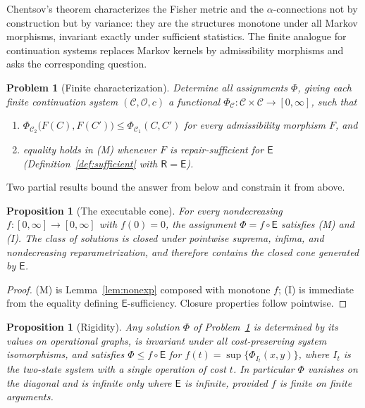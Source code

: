 \documentclass[11pt]{article}
\newtheorem{proposition}[theorem]{Proposition}
\newtheorem{problem}[theorem]{Problem}
\theoremstyle{remark}
\newcommand{\C}{\mathcal{C}}
\newcommand{\Ops}{\mathcal{O}}
\newcommand{\R}{\mathsf{R}}
\newcommand{\E}{\mathsf{E}}
\begin{document}
Chentsov's theorem \cite{chentsov} characterizes the Fisher metric and
the $\alpha$-connections not by construction but by variance: they are
the structures monotone under all Markov morphisms, invariant exactly
under sufficient statistics. The finite analogue for continuation
systems replaces Markov kernels by admissibility morphisms and asks
the corresponding question.

\begin{problem}[Finite characterization]\label{prob:char}
Determine all assignments $\Phi$, giving each finite continuation
system $(\C,\Ops,c)$ a functional
$\Phi_{\C}\colon\C\times\C\to[0,\infty]$, such that
\begin{enumerate}
\item[(M)] $\Phi_{\C_2}\bigl(F(C),F(C')\bigr) \le \Phi_{\C_1}(C,C')$
for every admissibility morphism $F$, and
\item[(I)] equality holds in (M) whenever $F$ is repair-sufficient for
$\E$ (Definition~\ref{def:sufficient} with $\R=\E$).
\end{enumerate}
\end{problem}

Two partial results bound the answer from below and constrain it from
above.

\begin{proposition}[The executable cone]\label{prop:cone}
For every nondecreasing $f\colon[0,\infty]\to[0,\infty]$ with
$f(0)=0$, the assignment $\Phi = f\circ\E$ satisfies (M) and (I). The
class of solutions is closed under pointwise suprema, infima, and
nondecreasing reparametrization, and therefore contains the closed
cone generated by $\E$.
\end{proposition}

\begin{proof}
(M) is Lemma~\ref{lem:nonexp} composed with monotone $f$; (I) is
immediate from the equality defining $\E$-sufficiency. Closure
properties follow pointwise.
\end{proof}

\begin{proposition}[Rigidity]\label{prop:rigidity}
Any solution $\Phi$ of Problem~\ref{prob:char} is determined by its
values on operational graphs, is invariant under all cost-preserving
system isomorphisms, and satisfies $\Phi \le f\circ\E$ for
$f(t)=\sup\{\Phi_{I_t}(x,y)\}$, where $I_t$ is the two-state system
with a single operation of cost $t$. In particular $\Phi$ vanishes on
the diagonal and is infinite only where $\E$ is infinite, provided
$f$ is finite on finite arguments.
\end{proposition}
\end{document}
